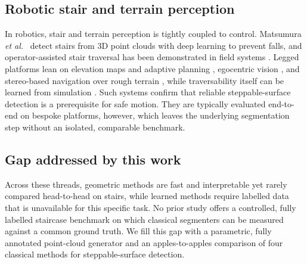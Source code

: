 \subsection{Robotic stair and terrain perception}
In robotics, stair and terrain perception is tightly coupled to control.
Matsumura \emph{et al.}\ \cite{matsumura2022deep} detect stairs from 3D
point clouds with deep learning to prevent falls, and operator-assisted
stair traversal has been demonstrated in field systems
\cite{marion2017director}. Legged platforms lean on elevation maps and
adaptive planning \cite{belter2016adaptive}, egocentric vision
\cite{agarwal2022legged}, and stereo-based navigation over rough terrain
\cite{stelzer2012stereo}, while traversability itself can be learned from
simulation \cite{chavezgarcia2017learning}. Such systems confirm that
reliable steppable-surface detection is a prerequisite for safe motion.
They are typically evaluated end-to-end on bespoke platforms, however,
which leaves the underlying segmentation step without an isolated,
comparable benchmark.

\subsection{Gap addressed by this work}
Across these threads, geometric methods are fast and interpretable yet
rarely compared head-to-head on stairs, while learned methods require
labelled data that is unavailable for this specific task. No prior study
offers a controlled, fully labelled staircase benchmark on which
classical segmenters can be measured against a common ground truth. We
fill this gap with a parametric, fully annotated point-cloud generator
and an apples-to-apples comparison of four classical methods for
steppable-surface detection.
